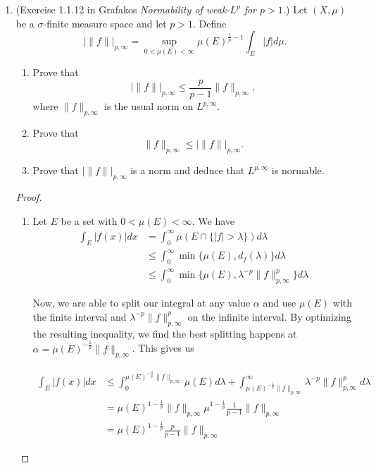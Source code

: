 \documentclass[a4paper]{article}
\begin{document}
\begin{enumerate}
\begin{proof}
    \end{proof}

  \item (Exercise 1.1.12 in Grafakos \textit{Normability of weak-$L^p$ for $p>1$.}) Let $(X,\mu)$ be a $\sigma$-finite measure space and let $p>1$.
    Define
    \[ | \| f \| |_{p,\infty} = \sup_{0 < \mu(E) < \infty} \mu(E)^{\frac{1}{p} - 1} \int_{E}^{}|f| d \mu .\]

    \begin{enumerate}
      \item Prove that
        \[ | \| f \| |_{p,\infty} \leq \frac{p}{p-1} \|f\|_{p,\infty} ,\]
        where $\|f\|_{p,\infty}$ is the usual norm on $L^{p,\infty}$.

      \item Prove that
        \[ \|f\|_{p,\infty} \leq | \| f \| |_{p,\infty} .\]

      \item Prove that $| \| f \| |_{p,\infty}$ is a norm and deduce that $L^{p,\infty}$ is normable.

    \end{enumerate}

    \begin{proof}

      \begin{enumerate}
        \item
          Let $E$ be a set with $0<\mu(E)<\infty$. We have
          \begin{align*}
            \int_{E}^{} |f(x)| dx &= \int_{0}^{\infty} \mu( E \cap \{ |f| > \lambda \} ) d\lambda \\
            &\leq \int_{0}^{\infty} \min \{ \mu(E), d_f(\lambda) \} d\lambda \\
            &\leq \int_{0}^{\infty} \min \{ \mu(E), \lambda^{-p} \|f\|_{p,\infty}^p \} d\lambda
          \end{align*}

          Now, we are able to split our integral at any value $\alpha$ and use $\mu(E)$ with the finite interval and $\lambda^{-p} \|f\|_{p,\infty}^p$
          on the infinite interval. By optimizing the resulting inequality, we find the best splitting happens at $\alpha =
          \mu(E)^{-\frac{1}{p}} \|f\|_{p,\infty}$. This gives us

          \begin{align*}
            \int_{E}^{} |f(x)| dx &\leq \int_{0}^{\mu(E)^{-\frac{1}{p}} \|f\|_{p,\infty}} \mu(E) d\lambda + \int_{\mu(E)^{-\frac{1}{p}} \|f\|_{p,\infty}}^{\infty}
            \lambda^{-p} \|f\|_{p,\infty}^p d\lambda \\
            &= \mu(E)^{1-\frac{1}{p}} \|f\|_{p,\infty} \mu^{1-\frac{1}{p}} \frac{1}{p-1} \|f\|_{p,\infty} \\
            &= \mu(E)^{1-\frac{1}{p}} \frac{p}{p-1} \|f\|_{p,\infty}
          \end{align*}


\end{enumerate}
\end{proof}
\end{enumerate}
\end{document}
